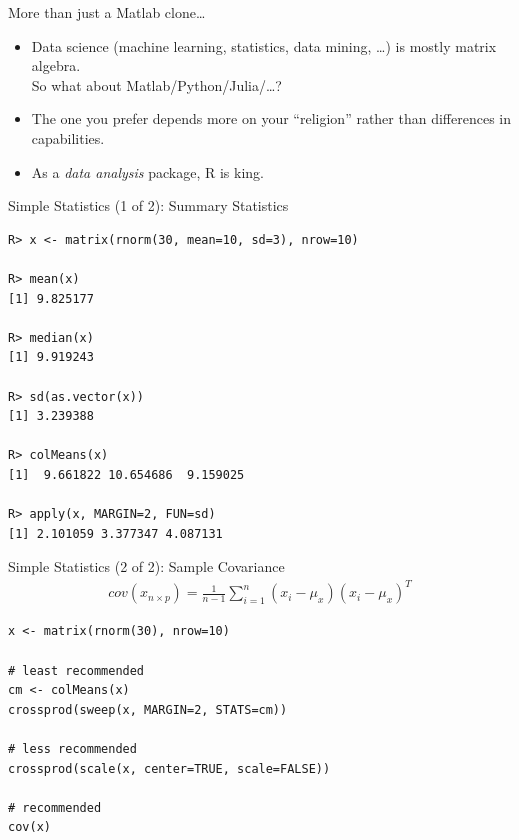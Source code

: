 \begin{frame}
  \begin{block}{More than just a Matlab clone\dots}\pause
  \begin{itemize}[<+-|alert@+>]
    \item Data science (machine learning, statistics, data mining, \dots) is mostly matrix algebra.  \\[.2cm]
     So what about Matlab/Python/Julia/\dots ?
    \item The one you prefer depends more on your ``religion'' rather than differences in capabilities.
    \item As a \emph{data analysis} package, R is king.
  \end{itemize}
\end{block}
\end{frame}


\begin{frame}[fragile]
  \begin{exampleblock}{Simple Statistics (1 of 2): Summary Statistics}\pause
  \begin{lstlisting}[backgroundcolor=\color{white},basicstyle=\ttfamily\color{dkgray}\scriptsize,keywordstyle=\color{black}, 
  commentstyle=\color{orange},stringstyle=\color{mauve}]
R> x <- matrix(rnorm(30, mean=10, sd=3), nrow=10)

R> mean(x)
[1] 9.825177

R> median(x)
[1] 9.919243

R> sd(as.vector(x))
[1] 3.239388

R> colMeans(x)
[1]  9.661822 10.654686  9.159025

R> apply(x, MARGIN=2, FUN=sd)
[1] 2.101059 3.377347 4.087131
\end{lstlisting}
  \end{exampleblock}
\end{frame}


\begin{frame}[fragile]
  \begin{exampleblock}{Simple Statistics (2 of 2): Sample Covariance}\pause
  \begin{align*}
    cov(x_{n\times p}) = \frac{1}{n-1}\sum_{i=1}^n\left(x_i-\mu_x\right)\left(x_i-\mu_x\right)^T
  \end{align*}
  \begin{lstlisting}
x <- matrix(rnorm(30), nrow=10)

# least recommended
cm <- colMeans(x)
crossprod(sweep(x, MARGIN=2, STATS=cm))

# less recommended
crossprod(scale(x, center=TRUE, scale=FALSE))

# recommended
cov(x)
\end{lstlisting}
  \end{exampleblock}
\end{frame}


